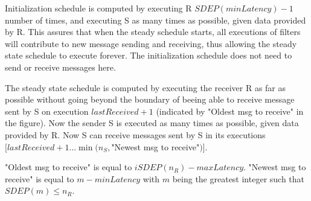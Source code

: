 Initialization schedule is computed by executing R $SDEP(minLatency)-1$ number of times, and executing S as many times as possible, given data provided by R. This assures that when the steady schedule starts, all executions of filters will contribute to new message sending and receiving, thus allowing the steady state schedule to execute forever. The initialization schedule does not need to send or receive messages here.

The steady state schedule is computed by executing the receiver R as far as possible without going beyond the boundary of beeing able to receive message sent by S on execution $lastReceived+1$ (indicated by "Oldest msg to receive" in the figure). Now the sender S is executed as many times as possible, given data provided by R. Now S can receive messages sent by S in its executions $[lastReceived+1 ... \min(n_S, $"Newest msg to receive"$)]$.

"Oldest msg to receive" is equal to $iSDEP(n_R)-maxLatency$. "Newest msg to receive" is equal to $m-minLatency$ with $m$ being the greatest integer such that $SDEP(m) \le n_R$.

